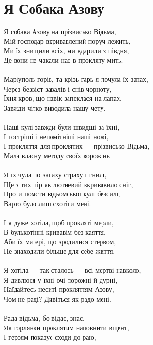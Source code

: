 \section{Я Собака Азову}

Я собака Азову на прізвисько Відьма,\\
Мій господар вкривавлений поруч лежить,\\
Ми їх знищили всіх, ми вдарили з півдня,\\
Де вони не чакали нас в прокляту мить.
\\
\\
Маріуполь горів, та крізь гарь я почула їх запах,\\
Через безвіст завалів і снів чорноту,\\
Їхня кров, що навік запеклася на лапах,\\
Завжди чітко виводила нашу чету.
\\
\\
Наші кулі завжди були швидші за їхні,\\
І гостріші і непомітніші наші ножі,\\
І прокляття для проклятих — прізвисько Відьма,\\
Мала власну методу своїх ворожінь
\\
\\
Я їх чула по запаху страху і гнилі,\\
Ще з тих пір як лютневий вкривавило сніг,\\
Проти помсти відьомської кулі безсилі,\\
Варто було лиш схотіти мені.
\\
\\
І я дуже хотіла, щоб прокляті мерли,\\
В булькотінні кривавім без каяття,\\
Аби їх матері, що зродилися стервом,\\
Не знаходили більше для себе життя.
\\
\\
Я хотіла — так сталось — всі мертві навколо,\\
Я дивлюся у їхні очі порожні й дурні,\\
Наїдайтесь неситі прокляттям Азову,\\
Чом не раді? Дивіться як радо мені.
\\
\\
Рада відьма, бо відає, знає,\\
Як горлянки проклятим наповнити вщент,\\
І героям показує сходи до раю,\\
